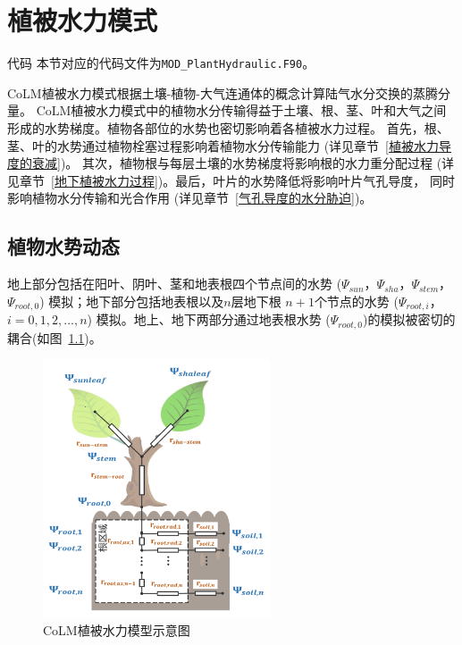 \chapter{植被水力模式}
\begin{mymdframed}{代码}
本节对应的代码文件为\texttt{MOD\_PlantHydraulic.F90}。
\end{mymdframed}

CoLM植被水力模式根据土壤-植物-大气连通体的概念计算陆气水分交换的蒸腾分量。
CoLM植被水力模式中的植物水分传输得益于土壤、根、茎、叶和大气之间形成的水势梯度。植物各部位的水势也密切影响着各植被水力过程。
首先，根、茎、叶的水势通过植物栓塞过程影响着植物水分传输能力 (详见章节~\ref{植被水力导度的衰减})。
其次，植物根与每层土壤的水势梯度将影响根的水力重分配过程 (详见章节~\ref{地下植被水力过程})。最后，叶片的水势降低将影响叶片气孔导度，
同时影响植物水分传输和光合作用 (详见章节~\ref{气孔导度的水分胁迫})。


\section{植物水势动态}\label{植物水势动态}
地上部分包括在阳叶、阴叶、茎和地表根四个节点间的水势 ($\Psi_{sun}$，$\Psi_{sha}$，$\Psi_{stem}$，$\Psi_{root,0}$)
%
 模拟；地下部分包括地表根以及$n$层地下根 $n+1$个节点的水势 ($\Psi_{root,i}$，$i=0,1,2,\ldots,n$) 模拟。地上、地下两部分通过地表根水势
 ($\Psi_{root,0}$)的模拟被密切的耦合(如图~\ref{fig:CoLM植被水力模型示意图})。

{
\begin{figure}[htb]
\centering
\includegraphics[width=0.6\textwidth]{Figures/植被水力模式/CoLM植被水力模型示意图.png}
\caption{CoLM植被水力模型示意图}
\label{fig:CoLM植被水力模型示意图}
\end{figure}
}



